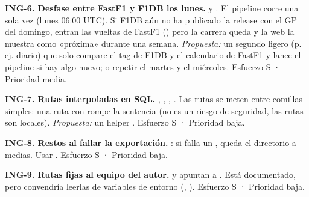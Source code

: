 \textbf{ING-6. Desfase entre FastF1 y F1DB los lunes.}  y . El pipeline corre una sola vez (lunes 06:00 UTC). Si F1DB aún no ha publicado la release con el GP del domingo, entran las vueltas de FastF1 () pero la carrera queda  y la web la muestra como «próxima» durante una semana. \emph{Propuesta:} un segundo  ligero (p. ej. diario) que solo compare el tag de F1DB y el calendario de FastF1 y lance el pipeline si hay algo nuevo; o repetir el martes y el miércoles. Esfuerzo S · Prioridad media.

\textbf{ING-7. Rutas interpoladas en SQL.} , , , . Las rutas se meten entre comillas simples: una ruta con  rompe la sentencia (no es un riesgo de seguridad, las rutas son locales). \emph{Propuesta:} un helper . Esfuerzo S · Prioridad baja.

\textbf{ING-8. Restos al fallar la exportación.} : si falla un , queda el directorio  a medias. Usar . Esfuerzo S · Prioridad baja.

\textbf{ING-9. Rutas fijas al equipo del autor.}  y  apuntan a . Está documentado, pero convendría leerlas de variables de entorno (, ). Esfuerzo S · Prioridad baja.

